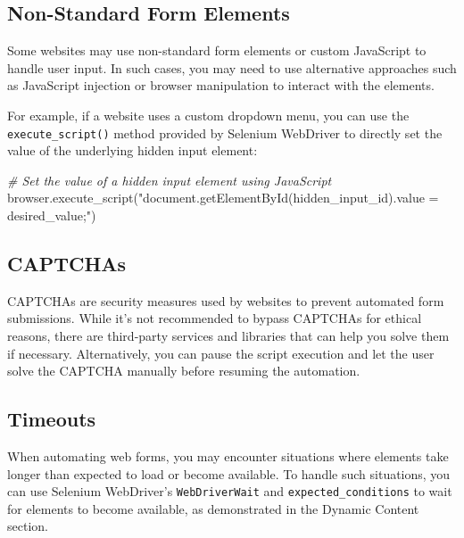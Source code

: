\documentclass[
  paper=a4,
  ,captions=tableheading
]{scrartcl}
\newenvironment{Shaded}{}{}
\newcommand{\CommentTok}[1]{\textcolor[rgb]{0.38,0.63,0.69}{\textit{#1}}}
\newcommand{\NormalTok}[1]{#1}
\newcommand{\StringTok}[1]{\textcolor[rgb]{0.25,0.44,0.63}{#1}}
\begin{document}
\hypertarget{non-standard-form-elements}{%
\subsection{Non-Standard Form
Elements}\label{non-standard-form-elements}}

Some websites may use non-standard form elements or custom JavaScript to
handle user input. In such cases, you may need to use alternative
approaches such as JavaScript injection or browser manipulation to
interact with the elements.

For example, if a website uses a custom dropdown menu, you can use the
\texttt{execute\_script()} method provided by Selenium WebDriver to
directly set the value of the underlying hidden input element:

\begin{Shaded}
\begin{Highlighting}[]

\CommentTok{\# Set the value of a hidden input element using JavaScript}
\NormalTok{browser.execute\_script(}\StringTok{"document.getElementById(\textquotesingle{}hidden\_input\_id\textquotesingle{}).value = \textquotesingle{}desired\_value\textquotesingle{};"}\NormalTok{)}
\end{Highlighting}
\end{Shaded}

\hypertarget{captchas}{%
\subsection{CAPTCHAs}\label{captchas}}

CAPTCHAs are security measures used by websites to prevent automated
form submissions. While it's not recommended to bypass CAPTCHAs for
ethical reasons, there are third-party services and libraries that can
help you solve them if necessary. Alternatively, you can pause the
script execution and let the user solve the CAPTCHA manually before
resuming the automation.

\hypertarget{timeouts}{%
\subsection{Timeouts}\label{timeouts}}

When automating web forms, you may encounter situations where elements
take longer than expected to load or become available. To handle such
situations, you can use Selenium WebDriver's \texttt{WebDriverWait} and
\texttt{expected\_conditions} to wait for elements to become available,
as demonstrated in the Dynamic Content section.
\end{document}
